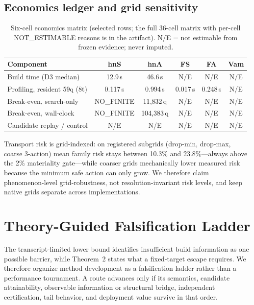 \documentclass{article}
\begin{document}
\subsection{Economics ledger and grid sensitivity}

\begin{table}[t]
\centering
\caption{Six-cell economics matrix (selected rows; the full 36-cell matrix with per-cell NOT\_ESTIMABLE
reasons is in the artifact). N/E = not estimable from frozen evidence; never imputed.}
\label{tab:economics}
\footnotesize
\setlength{\tabcolsep}{3.4pt}
\begin{tabular}{lccccc}
\toprule
Component & hnS & hnA & FS & FA & Vam \\
\midrule
Build time (D3 median) & 12.9\,s & 46.6\,s & N/E & N/E & N/E \\
Profiling, resident 59q (8t) & 0.117\,s & 0.994\,s & 0.017\,s & 0.248\,s & N/E \\
Break-even, search-only & NO\_FINITE & 11{,}832\,q & N/E & N/E & N/E \\
Break-even, wall-clock & NO\_FINITE & 104{,}383\,q & N/E & N/E & N/E \\
Candidate replay / control & N/E & N/E & N/E & N/E & N/E \\
\bottomrule
\end{tabular}
\end{table}

Transport risk is grid-indexed: on registered subgrids (drop-min, drop-max, coarse 3-action) mean family
risk stays between 10.3\% and 23.8\%---always above the 2\% materiality gate---while coarser grids
mechanically lower measured risk because the minimum safe action can only grow. We therefore claim
phenomenon-level grid-robustness, not resolution-invariant risk levels, and keep native grids separate
across implementations.

\section{Theory-Guided Falsification Ladder}
\label{sec:ladder}

The transcript-limited lower bound identifies insufficient build information as one possible barrier, while
Theorem~2 states what a fixed-target escape requires. We therefore organize method development as a
falsification ladder rather than a performance tournament. A route advances only if its semantics,
candidate attainability, observable information or structural bridge, independent certification, tail
behavior, and deployment value survive in that order.
\end{document}
